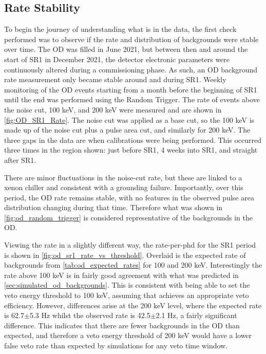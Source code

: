 \subsection{Rate Stability}
\par
To begin the journey of understanding what is in the data, the first check performed was to observe if the rate and distribution of backgrounds were stable over time.
The OD was filled in June 2021, but between then and around the start of SR1 in December 2021, the detector electronic parameters were continuously altered during a commissioning phase.
As such, an OD background rate measurement only became stable around and during SR1.
Weekly monitoring of the OD events starting from a month before the beginning of SR1 until the end was performed using the Random Trigger.
The rate of events above the noise cut, 100 keV, and 200 keV were measured and are shown in \autoref{fig:OD_SR1_Rate}.
The noise cut was applied as a base cut, so the 100 keV is made up of the noise cut plus a pulse area cut, and similarly for 200 keV.
The three gaps in the data are when calibrations were being performed.
This occurred three times in the region shown: just before SR1, 4 weeks into SR1, and straight after SR1.
\par
There are minor fluctuations in the noise-cut rate, but these are linked to a xenon chiller and consistent with a grounding failure.
Importantly, over this period, the OD rate remains stable, with no features in the observed pulse area distribution changing during that time.
Therefore what was shown in \autoref{fig:od_random_trigger} is considered representative of the backgrounds in the OD.
\par
Viewing the rate in a slightly different way, the rate-per-phd for the SR1 period is shown in \autoref{fig:od_sr1_rate_vs_threshold}.
Overlaid is the expected rate of backgrounds from \autoref{tab:od_expected_rates} for 100 and 200 keV.
Interestingly the rate above 100 keV is in fairly good agreement with what was predicted in \autoref{sec:simulated_od_backgrounds}.
This is consistent with being able to set the veto energy threshold to 100 keV, assuming that achieves an appropriate veto efficiency.
However, differences arise at the 200 keV level, where the expected rate is 62.7$\pm$5.3 Hz whilst the observed rate is 42.5$\pm$2.1 Hz, a fairly significant difference.
This indicates that there are fewer backgrounds in the OD than expected, and therefore a veto energy threshold of 200 keV would have a lower false veto rate than expected by simulations for any veto time window.


